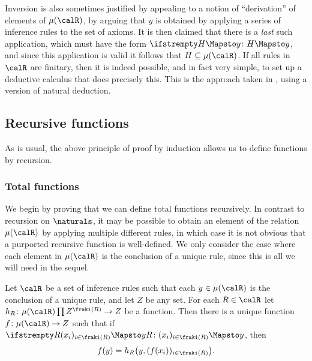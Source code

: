 Inversion is also sometimes justified by appealing to a notion of \enquote{derivation} of elements of $\lfp{\calR}$, by arguing that $y$ is obtained by applying a series of inference rules to the set of axioms. It is then claimed that there is a \emph{last} such application, which must have the form $\myinfrule{}{H}{y}$, and since this application is valid it follows that $H \subseteq \lfp{\calR}$. If all rules in $\calR$ are finitary, then it is indeed possible, and in fact very simple, to set up a deductive calculus that does precisely this. This is the approach taken in \textcite[e.g. Remark~2A8.6]{hindley-type-theory}, using a version of natural deduction.


\subsection{Recursive functions}

As is usual, the above principle of proof by induction allows us to define functions by recursion.


\subsubsection{Total functions}

We begin by proving that we can define total functions recursively. In contrast to recursion on $\naturals$, it may be possible to obtain an element of the relation $\lfp{\calR}$ by applying multiple different rules, in which case it is not obvious that a purported recursive function is well-defined. We only consider the case where each element in $\lfp{\calR}$ is the conclusion of a unique rule, since this is all we will need in the sequel.

\begin{theorem}[Recursion]
    \label{thm:recursive-definitions}
    Let $\calR$ be a set of inference rules such that each $y \in \lfp{\calR}$ is the conclusion of a unique rule, and let $Z$ be any set. For each $R \in \calR$ let $h_R \colon \lfp{\calR} \prod Z^{\idxset{R}} \to Z$ be a function. Then there is a unique function $f \colon \lfp{\calR} \to Z$ such that if $\myinfrule{R}{(x_i)_{i \in \idxset{R}}}{y}$, then
    \begin{equation}
        \label{eq:recursion-fixed-point-equation}
        f(y)
            = h_R \bigl( y, (f(x_i))_{i \in \idxset{R}} \bigr).
    \end{equation}
\end{theorem}

